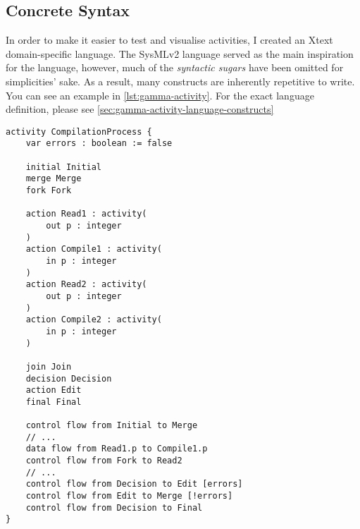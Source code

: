 \subsection{Concrete Syntax}

In order to make it easier to test and visualise activities, I created an Xtext domain-specific language. The SysMLv2 language served as the main inspiration for the language, however, much of the \emph{syntactic sugars} have been omitted for simplicities' sake. As a result, many constructs are inherently repetitive to write. You can see an example in \autoref{lst:gamma-activity}. For the exact language definition, please see \autoref{sec:gamma-activity-language-constructs}

\begin{lstlisting}[float,language=activity, caption={Gamma Activity Language representation of the compilation activity.}, label={lst:gamma-activity}]
activity CompilationProcess {
	var errors : boolean := false
	
	initial Initial
	merge Merge
	fork Fork
	
	action Read1 : activity(
		out p : integer
	)
	action Compile1 : activity(
		in p : integer
	)
	action Read2 : activity(
		out p : integer
	)
	action Compile2 : activity(
		in p : integer
	)
	
	join Join
	decision Decision
	action Edit
	final Final
	
	control flow from Initial to Merge 
	// ...	
	data flow from Read1.p to Compile1.p
	control flow from Fork to Read2 
	// ...
	control flow from Decision to Edit [errors]
	control flow from Edit to Merge [!errors]
	control flow from Decision to Final
}	
\end{lstlisting}